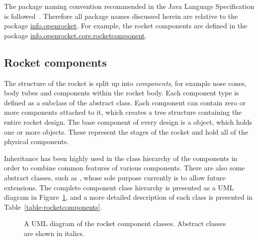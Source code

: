 The package naming convention recommended in the Java Language
Specification is followed~\cite{java-packages}.  Therefore all package
names discussed herein are relative to the package
\url{info.openrocket}.  For example, the rocket components are
defined in the package \url{info.openrocket.core.rocketcomponent}.




\subsection{Rocket components}
\label{sec-rocket-components}

The structure of the rocket is split up into {\it components}, for
example nose cones, body tubes and components within the rocket body.
Each component type is defined as a subclass of the abstract
 class.  Each component can contain zero or more
components attached to it, which creates a tree structure containing
the entire rocket design.  The base component of every design is a
 object, which holds one or more  objects.
These represent the stages of the rocket and hold all of the physical
components.

Inheritance has been highly used in the class hierarchy of the
components in order to combine common features of various components.
There are also some abstract classes, such as ,
whose sole purpose currently is to allow future extensions.  The
complete component class hierarchy is presented as a UML diagram in
Figure~\ref{fig-rocketcomponent-uml}, and a more detailed description
of each class is presented in Table~\ref{table-rocketcomponents}.

\begin{figure}
\centering
\hspace{-1cm}
\caption{A UML diagram of the rocket component classes.  Abstract
  classes are shown in italics.}
\label{fig-rocketcomponent-uml}
\end{figure}


